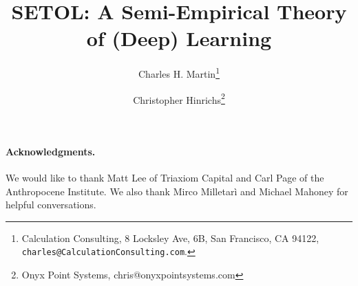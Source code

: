 \documentclass[11pt]{article}
\begin{document}
\title{%
SETOL: A Semi-Empirical Theory of (Deep) Learning
}

\author{%
Charles H. Martin\thanks{Calculation Consulting, 8 Locksley Ave, 6B, San Francisco, CA 94122, \texttt{charles@CalculationConsulting.com}.} 
\and
Christopher Hinrichs\thanks{Onyx Point Systems, chris@onyxpointsystems.com}
}

\date{}
\maketitle

\begin{abstract}

\end{abstract}

\newpage
\tableofcontents


\newpage

\newpage

\newpage

\newpage

\newpage

\newpage

\newpage



\noindent
\paragraph{Acknowledgments.}
We would like to thank Matt Lee of Triaxiom Capital and Carl Page of the Anthropocene Institute.
We also thank Mirco Milletarì and Michael Mahoney for helpful conversations.



%
{\small
%

%
}


\appendix


\end{document}
